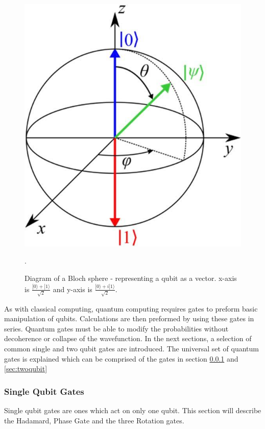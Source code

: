 \begin{figure}[H]
    \centering
    \includegraphics[scale=0.3]{images/Bloch-sphere-representation-of-a-qubit.png}
    \caption{Diagram of a Bloch sphere - 
 representing a qubit as a vector. x-axis is $\frac{|0\rangle + |1\rangle}{\sqrt{2}}$ and y-axis is $\frac{|0\rangle+i|1\rangle}{\sqrt{2}}$.\cite{sebastiano_cryo-cmos_2017}}.\label{fig:bloch}
\end{figure}

As with classical computing, quantum computing requires gates to preform basic manipulation of qubits. 
Calculations are then preformed by using these gates in series.
Quantum gates must be able to modify the probabilities without decoherence or collapse of the wavefunction. 
In the next sections, a selection of common single and two qubit gates are introduced.
The universal set of quantum gates is explained which can be comprised of the gates in section \ref{sec:singlequbit} and \ref{sec:twoqubit}  

\subsubsection{Single Qubit Gates}\label{sec:singlequbit}
Single qubit gates are ones which act on only one qubit. 
This section will describe the Hadamard, Phase Gate and the three Rotation gates. 

